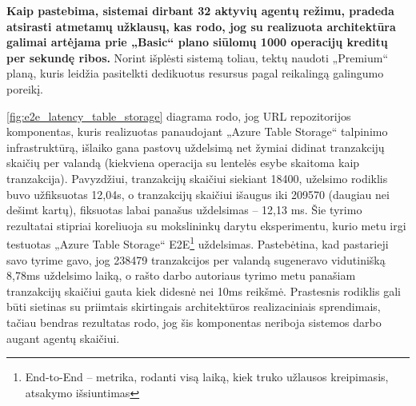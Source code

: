 \textbf{Kaip pastebima, sistemai dirbant 32 aktyvių agentų režimu, pradeda atsirasti atmetamų užklausų, kas rodo, jog su realizuota architektūra galimai artėjama prie „Basic“ plano siūlomų 1000 operacijų kreditų per sekundę ribos.} Norint išplėsti sistemą toliau, tektų naudoti „Premium“ planą, kuris leidžia pasitelkti dedikuotus resursus pagal reikalingą galingumo poreikį.

\pagebreak


\ref{fig:e2e_latency_table_storage} diagrama rodo, jog URL repozitorijos komponentas, kuris realizuotas panaudojant „Azure Table Storage“ talpinimo infrastruktūrą, išlaiko gana pastovų uždelsimą net žymiai didinat tranzakcijų skaičių per valandą (kiekviena operacija su lentelės esybe skaitoma kaip tranzakcija). Pavyzdžiui, tranzakcijų skaičiui siekiant 18400, uželsimo rodiklis buvo užfiksuotas 12,04s, o tranzakcijų skaičiui išaugus iki 209570 (daugiau nei dešimt kartų), fiksuotas labai panašus uždelsimas -- 12,13 ms. Šie tyrimo rezultatai stipriai koreliuoja su \cite{MercedCloudBasedWebCrawler} mokslininkų darytu eksperimentu, kurio metu irgi testuotas „Azure Table Storage“ E2E\footnote{End-to-End -- metrika, rodanti visą laiką, kiek truko užlausos kreipimasis, atsakymo išsiuntimas} uždelsimas. Pastebėtina, kad pastarieji savo tyrime gavo, jog 238479 tranzakcijos per valandą sugeneravo vidutinišką 8,78ms uždelsimo laiką, o rašto darbo autoriaus tyrimo metu panašiam tranzakcijų skaičiui gauta kiek didesnė nei 10ms reikšmė. Prastesnis rodiklis gali būti sietinas su priimtais skirtingais architektūros realizaciniais sprendimais, tačiau bendras rezultatas rodo, jog šis komponentas neriboja sistemos darbo augant agentų skaičiui.




